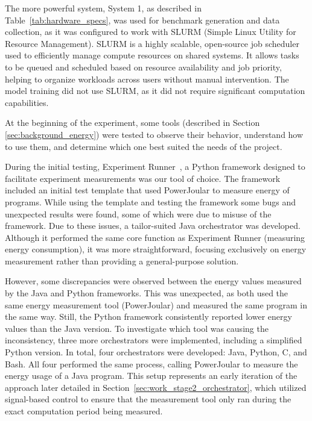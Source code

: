 The more powerful system, System 1, as described in Table~\ref{tab:hardware_specs}, was used for benchmark generation and data collection, as it was configured to work with SLURM (Simple Linux Utility for Resource Management). SLURM is a highly scalable, open-source job scheduler used to efficiently manage compute resources on shared systems. It allows tasks to be queued and scheduled based on resource availability and job priority, helping to organize workloads across users without manual intervention. The model training did not use SLURM, as it did not require significant computation capabilities.

At the beginning of the experiment, some tools (described in Section \ref{sec:background_energy}) were tested to observe their behavior, understand how to use them, and determine which one best suited the needs of the project.

During the initial testing, Experiment Runner~\cite{S2_Group_Experiment_Runner}, a Python framework designed to facilitate experiment measurements was our tool of choice. The framework included an initial test template that used PowerJoular to measure energy of programs. While using the template and testing the framework some bugs and unexpected results were found, some of which were due to misuse of the framework.
Due to these issues, a tailor-suited Java orchestrator was developed. Although it performed the same core function as Experiment Runner (measuring energy consumption), it was more straightforward, focusing exclusively on energy measurement rather than providing a general-purpose solution.

However, some discrepancies were observed between the energy values measured by the Java and Python frameworks. This was unexpected, as both used the same energy measurement tool (PowerJoular) and measured the same program in the same way. Still, the Python framework consistently reported lower energy values than the Java version.
To investigate which tool was causing the inconsistency, three more orchestrators were implemented, including a simplified Python version. In total, four orchestrators were developed: Java, Python, C, and Bash. All four performed the same process, calling PowerJoular to measure the energy usage of a Java program.
This setup represents an early iteration of the approach later detailed in Section~\ref{sec:work_stage2_orchestrator}, which utilized signal-based control to ensure that the measurement tool only ran during the exact computation period being measured.

